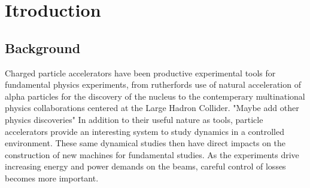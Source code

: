\chapter{Itroduction} 

\section{Background}
Charged particle accelerators have been productive experimental tools for fundamental physics experiments, from rutherfords use of natural acceleration of alpha particles for the discovery of the nucleus to the contemperary multinational physics collaborations centered at the Large Hadron Collider. "Maybe add other physics discoveries" In addition to their useful nature as tools, particle accelerators provide an interesting system to study dynamics in a controlled environment. These same dynamical studies then have direct impacts on the construction of new machines for fundamental studies. As the experiments drive increasing energy and power demands on the beams, careful control of losses becomes more important.


